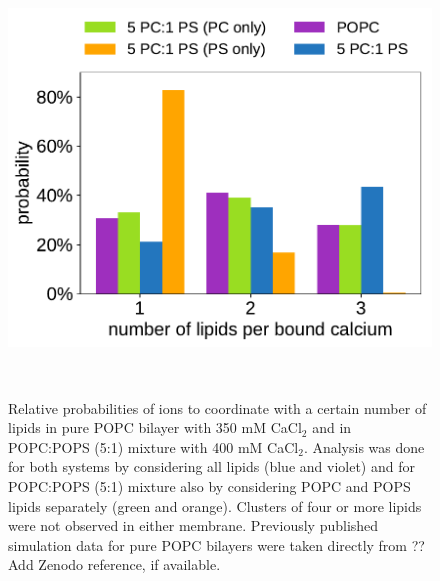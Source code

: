 \documentclass[journal=jpcbfk,manuscript=article]{achemso}
\newlength{\figwidth}
\begin{document}
\begin{figure}[tb!] 
  \centering 
  \includegraphics[width=\figwidth]{../img/stoichiometry_CaCl2_comparison_Ecc-lipids_PC-vs-PCPS.pdf} \\ 
  \caption{\label{fig:cacl_complexes} 
    Relative probabilities of  ions to coordinate with a certain number of lipids
    in pure POPC bilayer with 350 mM CaCl$_2$ and in POPC:POPS (5:1) mixture with 400 mM CaCl$_2$.  
    Analysis was done for both systems by considering all lipids (blue and violet) and
    for POPC:POPS (5:1) mixture also by considering POPC and POPS lipids separately (green and orange).
    Clusters of four or more lipids were not observed in either membrane.
    Previously published simulation data \cite{melcr18} for pure POPC bilayers were taken directly from ?? Add Zenodo reference, if available. 
  }
   \\
\end{figure} 


\end{document}
